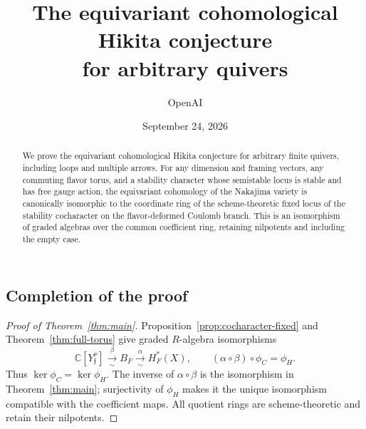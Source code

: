 \documentclass[11pt]{article}
\title{The equivariant cohomological Hikita conjecture\\for arbitrary quivers}
\author{OpenAI}
\date{September 24, 2026}
\newcommand{\C}{\mathbb C}
\theoremstyle{plain}
\theoremstyle{definition}
\numberwithin{equation}{section}
\begin{document}
\maketitle
\begin{abstract}
We prove the equivariant cohomological Hikita conjecture for arbitrary finite
quivers, including loops and multiple arrows. For any dimension and framing
vectors, any commuting flavor torus, and a stability character whose
semistable locus is stable and has free gauge action, the equivariant
cohomology of the Nakajima variety is canonically isomorphic to the coordinate
ring of the scheme-theoretic fixed locus of the stability cocharacter on the
flavor-deformed Coulomb branch. This is an isomorphism of graded algebras over
the common coefficient ring, retaining nilpotents and including the empty case.
\end{abstract}








\subsection*{Completion of the proof}
\begin{proof}[Proof of Theorem~\ref{thm:main}]
Proposition~\ref{prop:cocharacter-fixed} and Theorem~\ref{thm:full-torus}
give graded $R$-algebra isomorphisms
\[
 \C[Y_{\mathfrak f}^{\nu}]
   \xrightarrow[\ \sim\ ]{\beta} B_F
   \xrightarrow[\ \sim\ ]{\alpha} H_F^*(X),
 \qquad (\alpha\circ\beta)\circ\phi_C=\phi_H.
\]
Thus $\ker\phi_C=\ker\phi_H$.  The inverse of $\alpha\circ\beta$ is the
isomorphism in Theorem~\ref{thm:main}; surjectivity of $\phi_H$ makes it the
unique isomorphism compatible with the coefficient maps.  All quotient
rings are scheme-theoretic and retain their nilpotents.
\end{proof}


\end{document}
